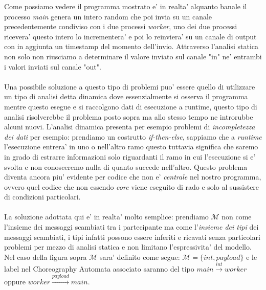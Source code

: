 
Come possiamo vedere il programma mostrato e' in realta' alquanto banale il processo \emph{main} genera un intero random che poi invia su un canale precedentemente condiviso con i due processi \emph{worker}, uno dei due processi ricevera' questo intero lo incrementera' e poi lo reinviera' su un canale di output con in aggiunta un timestamp del momento dell'invio. Attraverso l'analisi statica non solo non riusciamo a determinare il valore inviato sul canale "in" ne' entrambi i valori inviati sul canale "out". \\\\
Una possibile soluzione a questo tipo di problemi puo' essere quello di utilizzare un tipo di analisi detta dinamica dove essenzialmente si osserva il programma mentre questo esegue e si raccolgono dati di esecuzione a runtime, questo tipo di analisi risolverebbe il problema posto sopra ma allo stesso tempo ne introrubbe alcuni nuovi. L'analisi dinamica presenta per esempio problemi di \emph{incompletezza dei dati} per esempio: prendiamo un costrutto \emph{if-then-else}, sappiamo che a \emph{runtime} l'esecuzione entrera' in uno o nell'altro ramo questo tuttavia significa che saremo in grado di estrarre informazioni solo riguardanti il ramo in cui l'esecuzione si e' svolta e non conosceremo nulla di quanto succede nell'altro. Questo problema diventa ancora piu' evidente per codice che non e' \emph{centrale} nel nostro programma, ovvero quel codice che non essendo \emph{core} viene eseguito di rado e solo al sussistere di condizioni particolari.\\\\
La soluzione adottata qui e' in realta' molto semplice: prendiamo $\mathcal{M}$ non come l'insieme dei messaggi scambiati tra i partecipante ma come l'\emph{insieme dei tipi} dei messaggi scambiati, i tipi infatti possono essere inferiti e ricavati senza particolari problemi per mezzo di analisi statica e non limitano l'espressivita' del modello. Nel caso della figura sopra $\mathcal{M}$ sara' definito come segue: $\mathcal{M} = \{ int, payload \}$ e le label nel Choreography Automata associato saranno del tipo $main \xrightarrow{int} worker$ oppure $worker \xrightarrow{payload} main$.

